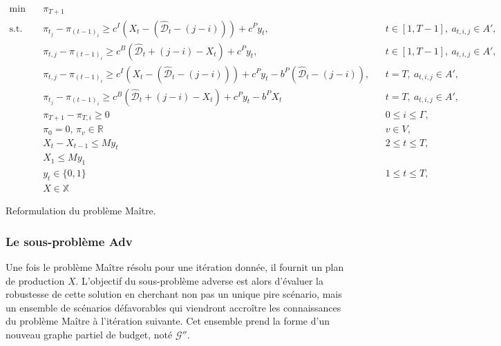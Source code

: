 \documentclass[12pt, a4paper, twoside]{article}
\numberwithin{equation}{section}
\newcommand{\adv}{\textbf{Adv} }
\begin{document}
    {\small
    	\begin{align}
    		\min\quad & \pi_{T+1}\\
    		\text{s.t.}\quad &\pi_{t_j}-\pi_{(t-1)_i} \geq c^I\left(X_t-(\hat{\mathcal{D}}_t-(j-i))\right)+c^P y_t, &&t\in[1,T-1],\ a_{t,i,j}\in A',\\
    		&\pi_{t,j}-\pi_{(t-1)_i} \ge c^B\left(\hat{\mathcal{D}}_t+(j-i)-X_t\right)+c^P y_t, && t\in[1,T-1],\ a_{t,i,j}\in A',\\
    		&\pi_{t,j}-\pi_{(t-1)_i} \ge c^I\left(X_t-(\hat{\mathcal{D}}_t-(j-i))\right) +c^P y_t -b^P(\hat{\mathcal{D}}_t-(j-i)), &&t=T,\ a_{t,i,j}\in A',\\
    		&\pi_{t_j}-\pi_{(t-1)_i} \geq c^B(\hat{\mathcal{D}}_t + (j-i)-X_t)+c^Py_t-b^PX_t && t=T,\ a_{t,i,j}\in A',\\
    		& \pi_{T+1}-\pi_{T, i}\geq 0 && 0\leq i\leq \Gamma,\\
    		&\pi_0=0,\, \pi_v\in\mathbb{R} && v\in V,\\
    		&X_t-X_{t-1}\leq My_t && 2\leq t \leq T,\\
    		& X_1 \leq My_1\\
    		& y_t \in \{0, 1\} && 1\leq t\leq T,\\
    		& X\in\mathbb{X}
    	\end{align}
	}
    
	\vspace{-0.5em}
	{   \centering
		\small Reformulation du problème Maître. \cite{portoleauTHESIS}\par
		\label{reformulation_pbr_maitre}
	}
	
	\subsubsection{Le sous-problème \adv}
	
	Une fois le problème Maître résolu pour une itération donnée, il fournit un plan de production $X$. L'objectif du sous-problème adverse est alors d'évaluer la robustesse de cette solution en cherchant non pas un unique pire scénario, mais un ensemble de scénarios défavorables qui viendront accroître les connaissances du problème Maître à l'itération suivante. Cet ensemble prend la forme d'un nouveau graphe partiel de budget, noté $\mathcal{G}''$.
\end{document}
